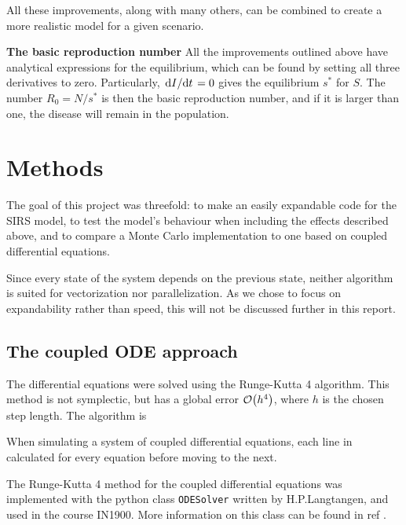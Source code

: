 \documentclass[a4paper,10pt,twocolumn]{article}
\begin{document}
All these improvements, along with many others, can be combined to create a more realistic model for a given scenario.
 
\textbf{The basic reproduction number}
All the improvements outlined above have analytical expressions for the equilibrium, which can be found by setting all three derivatives to zero. Particularly, $\dv*{I}{t} = 0$ gives the equilibrium $s^*$ for $S$. The number $R_0=N/s^*$ is then the basic reproduction number, and if it is larger than one, the disease will remain in the population. 
 
%
%
%
\section{Methods}

The goal of this project was threefold: to make an easily expandable code for the SIRS model,  to test the model's behaviour when including the effects described above, and to compare a Monte Carlo implementation to one based on coupled differential equations.

Since every state of the system depends on the previous state, neither algorithm is suited for vectorization nor parallelization. As we chose to focus on expandability rather than speed, this will not be discussed further in this report.  

\subsection{The coupled ODE approach}

The differential equations were solved using the Runge-Kutta 4 algorithm. This method is not symplectic, but has a global error $\order{h^4}$, where $h$ is the chosen step length. The algorithm is
%
\begin{algorithmic}
\EndFor
\end{algorithmic}
%
When simulating a system of coupled differential equations, each line in calculated for every equation before moving to the next. 

The Runge-Kutta 4 method for the coupled differential equations was implemented with the python class \texttt{ODESolver} written by H.P.Langtangen, and used in the course IN1900. More information on this class can be found in ref \cite{in1900}. 
\end{document}
